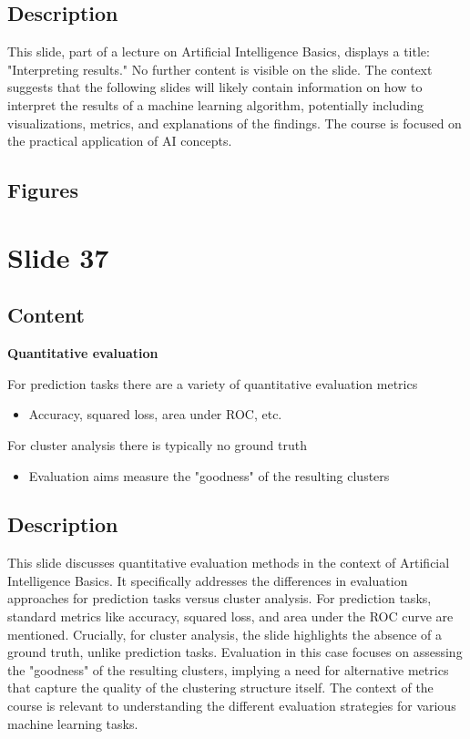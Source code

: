 \documentclass{article}%
\begin{document}
\subsection{Description}%
This slide, part of a lecture on Artificial Intelligence Basics, displays a title: "Interpreting results."  No further content is visible on the slide.  The context suggests that the following slides will likely contain information on how to interpret the results of a machine learning algorithm, potentially including visualizations, metrics, and explanations of the findings.  The course is focused on the practical application of AI concepts.%
\subsection{Figures}%
\begin{figure}[H]%
\centering%
\end{figure}

%
\newpage%
\section{Slide 37}%
\label{sec:Slide37}%
\subsection{Content}%

\textbf{Quantitative evaluation}

For prediction tasks there are a variety of quantitative evaluation metrics
\begin{itemize}
    \item Accuracy, squared loss, area under ROC, etc.
\end{itemize}

For cluster analysis there is typically no ground truth
\begin{itemize}
    \item Evaluation aims measure the "goodness" of the resulting clusters
\end{itemize}
%
\subsection{Description}%
This slide discusses quantitative evaluation methods in the context of Artificial Intelligence Basics.  It specifically addresses the differences in evaluation approaches for prediction tasks versus cluster analysis.  For prediction tasks, standard metrics like accuracy, squared loss, and area under the ROC curve are mentioned.  Crucially, for cluster analysis, the slide highlights the absence of a ground truth, unlike prediction tasks.  Evaluation in this case focuses on assessing the "goodness" of the resulting clusters, implying a need for alternative metrics that capture the quality of the clustering structure itself. The context of the course is relevant to understanding the different evaluation strategies for various machine learning tasks.%
\end{document}
